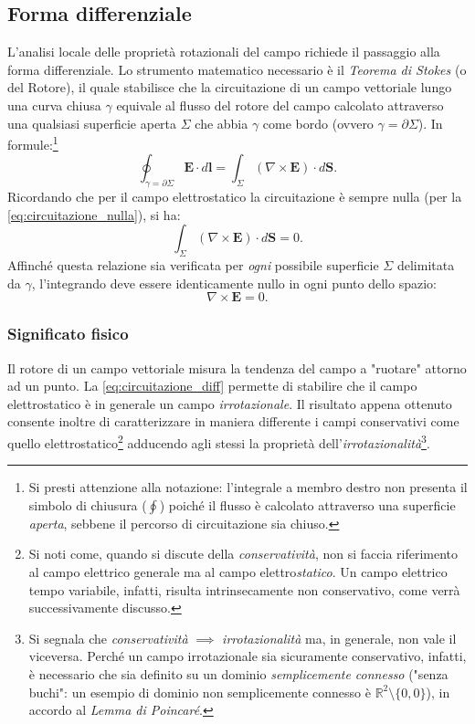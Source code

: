 \documentclass[a4paper,11pt]{report}
\begin{document}
\subsection{Forma differenziale}
L'analisi locale delle proprietà rotazionali del campo richiede il passaggio alla forma differenziale.
Lo strumento matematico necessario è il \textit{Teorema di Stokes} (o del Rotore), il quale stabilisce che la circuitazione di un campo vettoriale lungo una curva chiusa $\gamma$ equivale al flusso del rotore del campo calcolato attraverso una qualsiasi superficie aperta $\Sigma$ che abbia $\gamma$ come bordo (ovvero $\gamma = \partial \Sigma$).
In formule:\footnote{Si presti attenzione alla notazione: l'integrale a membro destro non presenta il simbolo di chiusura ($\oint$) poiché il flusso è calcolato attraverso una superficie \textit{aperta}, sebbene il percorso di circuitazione sia chiuso.}
\begin{equation}
    \oint_{\gamma = \partial \Sigma} \bm{E} \cdot d\bm{l} = \int_{\Sigma} (\nabla \times \bm{E}) \cdot d\bm{S}.
\end{equation}
Ricordando che per il campo elettrostatico la circuitazione è sempre nulla (per la \eqref{eq:circuitazione_nulla}), si ha:
\begin{equation}
    \int_{\Sigma} (\nabla \times \bm{E}) \cdot d\bm{S} = 0.
\end{equation}
Affinché questa relazione sia verificata per \textit{ogni} possibile superficie $\Sigma$ delimitata da $\gamma$, l'integrando deve essere identicamente nullo in ogni punto dello spazio:
\begin{equation}
    \boxed{\nabla \times \bm{E} = 0}.
    \label{eq:circuitazione_diff}
\end{equation}


\subsubsection{Significato fisico}
Il rotore di un campo vettoriale misura la tendenza del campo a "ruotare" attorno ad un punto. La \eqref{eq:circuitazione_diff} permette di stabilire che il campo elettrostatico è in generale un campo \textit{irrotazionale}. Il risultato appena ottenuto consente inoltre di caratterizzare in maniera differente i campi conservativi come quello elettrostatico\footnote{Si noti come, quando si discute della \emph{conservatività}, non si faccia riferimento al campo elettrico generale ma al campo elettro\emph{statico}. Un campo elettrico tempo variabile, infatti, risulta intrinsecamente non conservativo, come verrà successivamente discusso.} adducendo agli stessi la proprietà dell'\textit{irrotazionalità}\footnote{Si segnala che \emph{conservatività} $\implies$ \emph{irrotazionalità} ma, in generale, non vale il viceversa. Perché un campo irrotazionale sia sicuramente conservativo, infatti, è necessario che sia definito su un dominio \emph{semplicemente connesso} ("senza buchi": un esempio di dominio non semplicemente connesso è $\mathbb{R}^2 \setminus \{0,0\}$), in accordo al \emph{Lemma di Poincaré}. }.   
\end{document}
